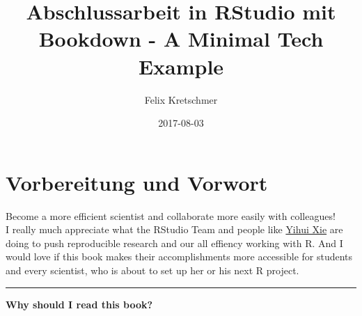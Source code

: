 \documentclass[]{book}
\title{Abschlussarbeit in RStudio mit Bookdown - A Minimal Tech Example}
\author{Felix Kretschmer}
\date{2017-08-03}
\theoremstyle{definition}
\theoremstyle{definition}
\theoremstyle{remark}
\begin{document}
\maketitle

{
\setcounter{tocdepth}{1}
\tableofcontents
}
\listoftables
\listoffigures
\chapter*{Vorbereitung und Vorwort}\label{vorbereitung-und-vorwort}

Become a more efficient scientist and collaborate more easily with
colleagues!\\
I really much appreciate what the RStudio Team and people like
\href{https://yihui.name/}{Yihui Xie} are doing to push reproducible
research and our all effiency working with R. And I would love if this
book makes their accomplishments more accessible for students and every
scientist, who is about to set up her or his next R project.

\begin{center}\rule{0.5\linewidth}{\linethickness}\end{center}

\textbf{Why should I read this book?}
\end{document}
